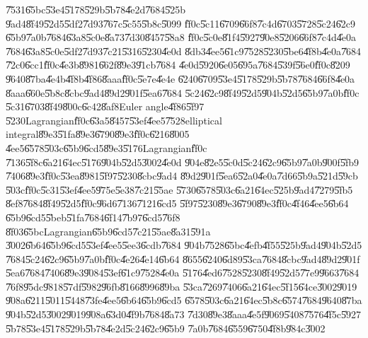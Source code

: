 \documentclass[12pt]{article}
\begin{document}
\U{7531}\U{65bc}\U{53e4}\U{5178}\U{529b}\U{5b78}\U{4e2d}\U{7684}\U{525b}%
\U{9ad4}\U{8f49}\U{52d5}\U{5df2}\U{7d93}\U{767c}\U{5c55}\U{5b8c}\U{5099}%
\U{ff0c}\U{5c11}\U{6709}\U{66f8}\U{7c4d}\U{6703}\U{5728}\U{5c24}\U{62c9}%
\U{65b9}\U{7a0b}\U{7684}\U{63a8}\U{5c0e}\U{8a73}\U{7d30}\U{8457}\U{58a8}%
\U{ff0c}\U{5c0e}\U{81f4}\U{5927}\U{90e8}\U{5206}\U{66f8}\U{7c4d}\U{4e0a}%
\U{7684}\U{63a8}\U{5c0e}\U{5df2}\U{7d93}\U{7c21}\U{5316}\U{5230}\U{4e0d}%
\U{8db3}\U{4ee5}\U{61c9}\U{7528}\U{5230}\U{5be6}\U{4f8b}\U{4e0a}\U{7684}%
\U{72c0}\U{6cc1}\U{ff0c}\U{4e3b}\U{8981}\U{662f}\U{89e3}\U{91cb}\U{7684}%
\U{4e0d}\U{5920}\U{6e05}\U{695a}\U{7684}\U{539f}\U{56e0}\U{ff0c}\U{8209}%
\U{9640}\U{87ba}\U{4e4b}\U{4f8b}\U{4f86}\U{8aaa}\U{ff0c}\U{5e7e}\U{4e4e}%
\U{6240}\U{6709}\U{53e4}\U{5178}\U{529b}\U{5b78}\U{7684}\U{66f8}\U{4e0a}%
\U{8aaa}\U{660e}\U{5b8c}\U{8cbc}\U{9ad4}\U{89d2}\U{901f}\U{5ea6}\U{7684}%
\U{5c24}\U{62c9}\U{8f49}\U{52d5}\U{904b}\U{52d5}\U{65b9}\U{7a0b}\U{ff0c}%
\U{5c31}\U{6703}\U{8f49}\U{800c}\U{6c42}\U{8af8}Euler angle\U{4f86}\U{5f97}%
\U{5230}Lagrangian\U{ff0c}\U{63a5}\U{8457}\U{53ef}\U{4ee5}\U{7528}elliptical
integral\U{89e3}\U{51fa}\U{89e3}\U{6790}\U{89e3}\U{ff0c}\U{6216}\U{8005}%
\U{4ee5}\U{6578}\U{503c}\U{65b9}\U{6cd5}\U{89e3}\U{5176}Lagrangian\U{ff0c}%
\U{7136}\U{5f8c}\U{6a21}\U{64ec}\U{5176}\U{904b}\U{52d5}\U{3002}\U{4e0d}%
\U{904e}\U{82e5}\U{5c0d}\U{5c24}\U{62c9}\U{65b9}\U{7a0b}\U{900f}\U{5fb9}%
\U{7406}\U{89e3}\U{ff0c}\U{53ea}\U{8981}\U{5f97}\U{5230}\U{8cbc}\U{9ad4}%
\U{89d2}\U{901f}\U{5ea6}\U{52a0}\U{4e0a}\U{7d66}\U{5b9a}\U{521d}\U{59cb}%
\U{503c}\U{ff0c}\U{5c31}\U{53ef}\U{4ee5}\U{975e}\U{5e38}\U{7c21}\U{55ae}%
\U{5730}\U{6578}\U{503c}\U{6a21}\U{64ec}\U{525b}\U{9ad4}\U{7279}\U{5fb5}%
\U{8ef8}\U{7684}\U{8f49}\U{52d5}\U{ff0c}\U{96d6}\U{7136}\U{7121}\U{6cd5}%
\U{5f97}\U{5230}\U{89e3}\U{6790}\U{89e3}\U{ff0c}\U{4f46}\U{4ee5}\U{6b64}%
\U{65b9}\U{6cd5}\U{5beb}\U{51fa}\U{7684}\U{6f14}\U{7b97}\U{6cd5}\U{76f8}%
\U{8f03}\U{65bc}Lagrangian\U{65b9}\U{6cd5}\U{7c21}\U{55ae}\U{8a31}\U{591a}%
\U{3002}\U{6b64}\U{65b9}\U{6cd5}\U{53ef}\U{4ee5}\U{5ee3}\U{6cdb}\U{7684}%
\U{904b}\U{7528}\U{65bc}\U{4efb}\U{4f55}\U{525b}\U{9ad4}\U{904b}\U{52d5}%
\U{7684}\U{5c24}\U{62c9}\U{65b9}\U{7a0b}\U{ff0c}\U{4e26}\U{4e14}\U{6b64}%
\U{8655}\U{6240}\U{6d89}\U{53ca}\U{7684}\U{8cbc}\U{9ad4}\U{89d2}\U{901f}%
\U{5ea6}\U{7684}\U{7406}\U{89e3}\U{9084}\U{53ef}\U{61c9}\U{7528}\U{4e0a}%
\U{5176}\U{4ed6}\U{7528}\U{5230}\U{8f49}\U{52d5}\U{77e9}\U{9663}\U{7684}%
\U{76f8}\U{95dc}\U{9818}\U{57df}\U{5982}\U{96fb}\U{8166}\U{8996}\U{89ba}%
\U{53ca}\U{7269}\U{7406}\U{6a21}\U{64ec}\U{5f15}\U{64ce}\U{3002}\U{9019}%
\U{908a}\U{6211}\U{5011}\U{5448}\U{73fe}\U{4ee5}\U{6b64}\U{65b9}\U{6cd5}%
\U{6578}\U{503c}\U{6a21}\U{64ec}\U{5b8c}\U{6574}\U{7684}\U{9640}\U{87ba}%
\U{904b}\U{52d5}\U{3002}\U{9019}\U{908a}\U{63d0}\U{4f9b}\U{7684}\U{8a73}%
\U{7d30}\U{89e3}\U{8aaa}\U{4e5f}\U{9069}\U{5408}\U{7576}\U{4f5c}\U{5927}%
\U{5b78}\U{53e4}\U{5178}\U{529b}\U{5b78}\U{4e2d}\U{5c24}\U{62c9}\U{65b9}%
\U{7a0b}\U{7684}\U{6559}\U{6750}\U{4f8b}\U{984c}\U{3002}
\end{document}
